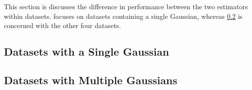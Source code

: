 This section is discusses the difference in performance between the two estimators within datasets.  focuses on datasets containing a single Gaussian, whereas \cref{s:discussion:multipleGaussians} is concerned with the other four datasets.

\subsection{Datasets with a Single Gaussian}
	\label{s:discussion:singleGaussian}
	


\subsection{Datasets with Multiple Gaussians}
	\label{s:discussion:multipleGaussians}
	

